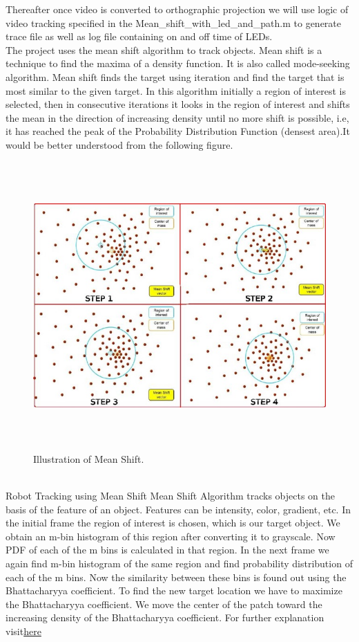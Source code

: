 \documentclass[a4paper,12pt,oneside]{book}
\begin{document}
Thereafter once video is converted to orthographic projection we will use logic of video tracking specified in the  Mean\_shift\_with\_led\_and\_path.m to generate trace file as well as log file containing on and off time of LEDs.\\
The project uses the mean shift algorithm to track objects.
Mean shift is a technique to find the maxima of a density function. It is also called mode-seeking algorithm.
Mean shift finds the target using iteration and find the target that is most similar to the given target. 
In this algorithm initially a region of interest is selected, then in consecutive iterations it looks in the region of interest and shifts the mean in the direction of increasing density until no more shift is possible, i.e, it has reached the peak of the Probability Distribution Function (densest area).It would be better understood from the following figure.
    \begin{figure}[h!]
		\includegraphics[width=1\linewidth, height=11cm]{ROI.jpg}
		\centering
		\caption{Illustration of Mean Shift.}
	\end{figure}\\
Robot Tracking using Mean Shift
Mean Shift Algorithm tracks objects on the basis of the feature of an object. Features can be intensity, color, gradient, etc. In the initial frame the region of interest is chosen, which is our target object. We obtain an m-bin histogram of this region after converting it to grayscale. Now PDF of each of the m bins is calculated in that region. In the next frame we again find m-bin histogram of the same region and find probability distribution of each of the m bins. Now the similarity between these bins is found out using the Bhattacharyya coefficient. To find the new target location we have to maximize the Bhattacharyya coefficient.  We move the center of the patch toward the increasing density of the Bhattacharyya coefficient. For further explanation visit\href{https://www.youtube.com/watch?v=M8B3RZVqgOo}{here} 
\end{document}
